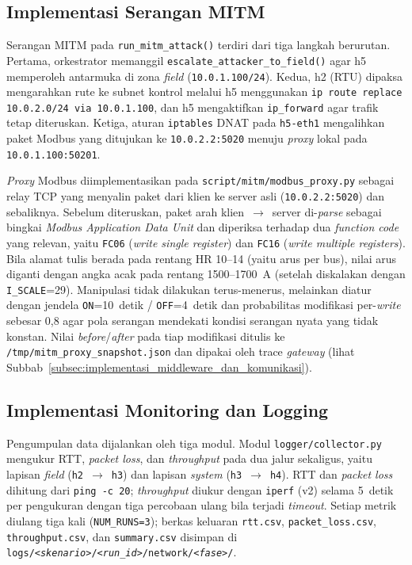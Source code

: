 \subsection{Implementasi Serangan MITM}
\label{subsec:implementasi_serangan_mitm}
Serangan \ac{MITM} pada \texttt{run\_mitm\_attack()} terdiri dari tiga langkah berurutan. Pertama, orkestrator memanggil \texttt{escalate\_attacker\_to\_field()} agar h5 memperoleh antarmuka di zona \textit{field} (\texttt{10.0.1.100/24}). Kedua, h2 (RTU) dipaksa mengarahkan rute ke subnet kontrol melalui h5 menggunakan \texttt{ip route replace 10.0.2.0/24 via 10.0.1.100}, dan h5 mengaktifkan \texttt{ip\_forward} agar trafik tetap diteruskan. Ketiga, aturan \texttt{iptables} \ac{DNAT} pada \texttt{h5-eth1} mengalihkan paket Modbus yang ditujukan ke \texttt{10.0.2.2:5020} menuju \textit{proxy} lokal pada \texttt{10.0.1.100:50201}.

\textit{Proxy} Modbus diimplementasikan pada \texttt{script/mitm/modbus\_proxy.py} sebagai relay TCP yang menyalin paket dari klien ke server asli (\texttt{10.0.2.2:5020}) dan sebaliknya. Sebelum diteruskan, paket arah klien~$\to$~server di-\textit{parse} sebagai bingkai \textit{Modbus Application Data Unit} dan diperiksa terhadap dua \textit{function code} yang relevan, yaitu \texttt{FC06} (\textit{write single register}) dan \texttt{FC16} (\textit{write multiple registers}). Bila alamat tulis berada pada rentang \ac{HR} 10--14 (yaitu arus per bus), nilai arus diganti dengan angka acak pada rentang 1500--1700~A (setelah diskalakan dengan \texttt{I\_SCALE}=29). Manipulasi tidak dilakukan terus-menerus, melainkan diatur dengan jendela \texttt{ON}=10~detik / \texttt{OFF}=4~detik dan probabilitas modifikasi per-\textit{write} sebesar 0{,}8 agar pola serangan mendekati kondisi serangan nyata yang tidak konstan. Nilai \textit{before}/\textit{after} pada tiap modifikasi ditulis ke \texttt{/tmp/mitm\_proxy\_snapshot.json} dan dipakai oleh trace \textit{gateway} (lihat Subbab~\ref{subsec:implementasi_middleware_dan_komunikasi}).

\subsection{Implementasi Monitoring dan Logging}
\label{subsec:implementasi_monitoring_dan_logging}
Pengumpulan data dijalankan oleh tiga modul. Modul \texttt{logger/collector.py} mengukur RTT, \textit{packet loss}, dan \textit{throughput} pada dua jalur sekaligus, yaitu lapisan \textit{field} (\texttt{h2}~$\rightarrow$~\texttt{h3}) dan lapisan \textit{system} (\texttt{h3}~$\rightarrow$~\texttt{h4}). RTT dan \textit{packet loss} dihitung dari \texttt{ping -c 20}; \textit{throughput} diukur dengan \texttt{iperf} (v2) selama 5~detik per pengukuran dengan tiga percobaan ulang bila terjadi \textit{timeout}. Setiap metrik diulang tiga kali (\texttt{NUM\_RUNS=3}); berkas keluaran \texttt{rtt.csv}, \texttt{packet\_loss.csv}, \texttt{throughput.csv}, dan \texttt{summary.csv} disimpan di \texttt{logs/\textit{<skenario>}/\textit{<run\_id>}/network/\textit{<fase>}/}.

